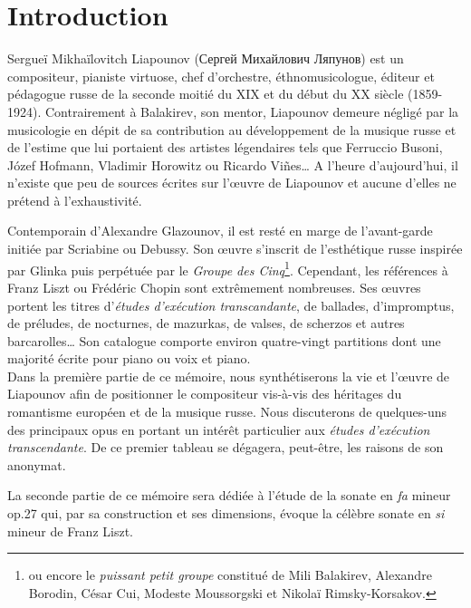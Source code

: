 
\chapter{Introduction}

Sergueï Mikhaïlovitch Liapounov (\foreignlanguage{russian}{Сергей Михайлович Ляпунов}) est un compositeur, pianiste virtuose, chef d'orchestre, éthnomusicologue, éditeur et pédagogue russe de la seconde moitié du XIX\ieme{} et du début du XX\ieme{} siècle (1859-1924). Contrairement à Balakirev, son mentor, Liapounov demeure négligé par la musicologie en dépit de sa contribution au développement de la musique russe et de l'estime que lui portaient des artistes légendaires tels que Ferruccio Busoni, Józef Hofmann, Vladimir Horowitz ou Ricardo Vi\~{n}es\dots{} A l'heure d'aujourd'hui, il n'existe que peu de sources écrites sur l'œuvre de Liapounov et aucune d'elles ne prétend à l'exhaustivité.

Contemporain d'Alexandre Glazounov, il est resté en marge de l'avant-garde initiée par Scriabine ou Debussy. Son œuvre s'inscrit de l’esthétique russe inspirée par Glinka puis perpétuée par le \emph{Groupe des Cinq}\footnote{ou encore le \emph{puissant petit groupe} constitué de Mili Balakirev, Alexandre Borodin, César Cui, Modeste Moussorgski et Nikolaï Rimsky-Korsakov.}. Cependant, les références à Franz Liszt ou Frédéric Chopin sont extrêmement nombreuses. Ses œuvres portent les titres d'\emph{études d'exécution transcandante}, de ballades, d'impromptus, de préludes, de nocturnes, de mazurkas, de valses, de scherzos et autres barcarolles\dots{} Son catalogue comporte environ quatre-vingt partitions dont une majorité écrite pour piano ou voix et piano.\\

Dans la première partie de ce mémoire, nous synthétiserons la vie et l'œuvre de Liapounov afin de positionner le compositeur vis-à-vis des héritages du romantisme européen et de la musique russe. Nous discuterons de quelques-uns des principaux opus en portant un intérêt particulier aux \emph{études d'exécution transcendante}. De ce premier tableau se dégagera, peut-être, les raisons de son anonymat.

La seconde partie de ce mémoire sera dédiée à l'étude de la sonate en \emph{fa} mineur op.27 qui, par sa construction et ses dimensions, évoque la célèbre sonate en \emph{si} mineur de Franz Liszt.


